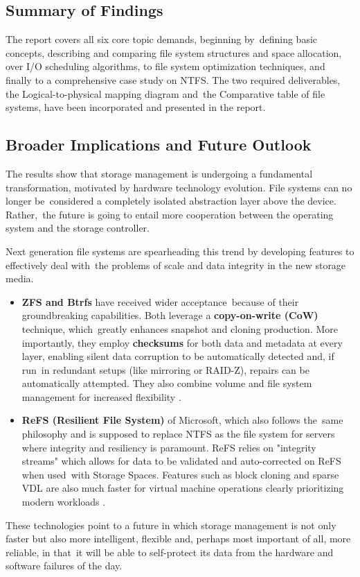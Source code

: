 \documentclass[12pt]{article}
\begin{document}
\subsection{Summary of Findings}
The report covers all six core topic demands, beginning by defining basic concepts, describing and comparing file system structures and space allocation, over I/O scheduling algorithms, to file system optimization techniques, and finally to a comprehensive case study on NTFS. The two required deliverables, the Logical-to-physical mapping diagram and the Comparative table of file systems, have been incorporated and presented in the report.

\subsection{Broader Implications and Future Outlook}
The results show that storage management is undergoing a fundamental transformation, motivated by hardware technology evolution. File systems can no longer be considered a completely isolated abstraction layer above the device. Rather, the future is going to entail more cooperation between the operating system and the storage controller.

Next generation file systems are spearheading this trend by developing features to effectively deal with the problems of scale and data integrity in the new storage media.
\begin{itemize}
    \item \textbf{ZFS and Btrfs} have received wider acceptance because of their groundbreaking capabilities. Both leverage a \textbf{copy-on-write (CoW)} technique, which greatly enhances snapshot and cloning production. More importantly, they employ \textbf{checksums} for both data and metadata at every layer, enabling silent data corruption to be automatically detected and, if run in redundant setups (like mirroring or RAID-Z), repairs can be automatically attempted. They also combine volume and file system management for increased flexibility \parencite{Nfina2025BtrfsZFS}.
    \item \textbf{ReFS (Resilient File System)} of Microsoft, which also follows the same philosophy and is supposed to replace NTFS as the file system for servers where integrity and resiliency is paramount. ReFS relies on "integrity streams" which allows for data to be validated and auto-corrected on ReFS when used with Storage Spaces. Features such as block cloning and sparse VDL are also much faster for virtual machine operations clearly prioritizing modern workloads \parencite{Microsoft2025ReFS}.
\end{itemize}
These technologies point to a future in which storage management is not only faster but also more intelligent, flexible and, perhaps most important of all, more reliable, in that it will be able to self-protect its data from the hardware and software failures of the day. 
\end{document}
